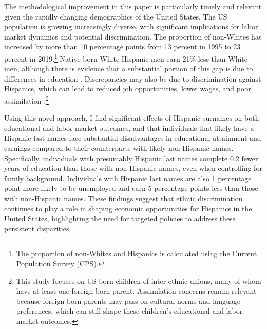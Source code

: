 The methodological improvement in this paper is particularly timely and relevant given the rapidly changing demographics of the United States. The US population is growing increasingly diverse, with significant implications for labor market dynamics and potential discrimination. The proportion of non-Whites has increased by more than 10 percentage points from 13 percent in 1995 to 23 percent in 2019.\footnote{The proportion of non-Whites and Hispanics is calculated using the Current Population Survey (CPS).} Native-born White Hispanic men earn 21\% less than White men, although there is evidence that a substantial portion of this gap is due to differences in education \autocite{duncan2006hispanics, duncan2018identifying, duncan2018socioeconomic}. Discrepancies may also be due to discrimination against Hispanics, which can lead to reduced job opportunities, lower wages, and poor assimilation \autocite{chettyWhereLandOpportunity2014,bowles2002inheritance, djajic2003assimilation}.\footnote{This study focuses on US-born children of inter-ethnic unions, many of whom have at least one foreign-born parent. Assimilation concerns remain relevant because foreign-born parents may pass on cultural norms and language preferences, which can still shape these children's educational and labor market outcomes.}

Using this novel approach, I find significant effects of Hispanic surnames on both educational and labor market outcomes, and that individuals that likely have a Hispanic last names face substantial disadvantages in educational attainment and earnings compared to their counterparts with likely non-Hispanic names. Specifically, individuals with presumably Hispanic last names complete 0.2 fewer years of education than those with non-Hispanic names, even when controlling for family background. Individuals with Hispanic last names are also 1 percentage point more likely to be unemployed and earn 5 percentage points less than those with non-Hispanic names. These findings suggest that ethnic discrimination continues to play a role in shaping economic opportunities for Hispanics in the United States, highlighting the need for targeted policies to address these persistent disparities.

